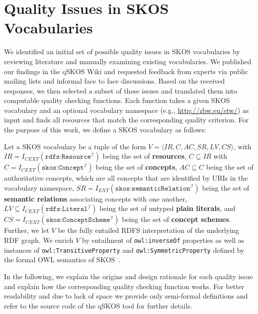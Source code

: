 
\section{Quality Issues in SKOS Vocabularies}\label{sec:criteria}


We identified an initial set of possible quality issues in SKOS vocabularies by reviewing literature and manually examining existing vocabularies. We published our findings in the qSKOS Wiki and requested feedback from experts via public mailing lists and informal face to face discussions. Based on the received responses, we then selected a subset of these issues and translated them into computable quality checking functions. Each function takes a given SKOS vocabulary and an optional vocabulary namespace (e.g., \url{http://zbw.eu/stw/}) as input and finds all resources that match the corresponding quality criterion. For the purpose of this work, we define a SKOS vocabulary as follows:

\begin{mydef}
Let a SKOS vocabulary be a tuple of the form $V = \langle IR, C, AC, SR, LV, CS \rangle$, with \(IR = I_{CEXT}(\texttt{rdfs:Resource}^\mathcal{I})\) being the set of \textbf{resources}, \(C \subseteq IR\) with \(C = I_{CEXT}(\texttt{skos:Concept}^\mathcal{I})\) being the set of \textbf{concepts}, \(AC \subseteq C\) being the set of authoritative concepts, which are all concepts that are identified by URIs in the vocabulary namespace, \(SR = I_{EXT}(\texttt{skos:semanticRelation}^\mathcal{I})\) being the set of \textbf{semantic relations} associating concepts with one another, $LV \subseteq I_{CEXT}(\texttt{rdfs:Literal}^\mathcal{I})$ being the set of untyped \textbf{plain literals}, and \(CS = I_{CEXT}(\texttt{skos:ConceptScheme}^\mathcal{I})\) being the set of \textbf{concept schemes}. Further, we let $V$ be the fully entailed RDFS interpretation of the underlying RDF graph. We enrich $V$ by entailment of \texttt{owl:inverseOf} properties as well as instances of \texttt{owl:TransitiveProperty} and \texttt{owl:SymmetricProperty} defined by the formal OWL semantics of SKOS~\cite{SkosReference2008}.
\end{mydef}

In the following, we explain the origins and design rationale for each quality issue and explain how the corresponding quality checking function works. For better readability and due to lack of space we provide only semi-formal definitions and refer to the source code of the qSKOS tool for further details.

